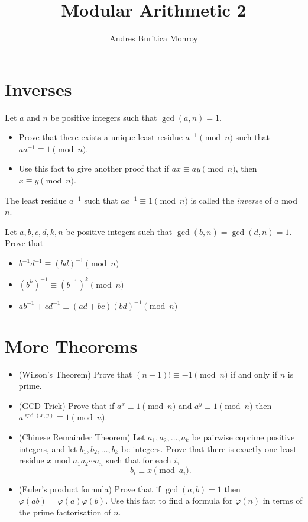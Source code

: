 \documentclass{article}
\title{Modular Arithmetic 2}
\author{Andres Buritica Monroy}
\date{}
\begin{document}
\maketitle
\section{Inverses}
Let $a$ and $n$ be positive integers such that $\gcd(a,n)=1$.
\begin{itemize}
	\item Prove that there exists a unique least residue $a^{-1}\pmod n$ such that
	      $aa^{-1}\equiv 1\pmod n$.
	\item Use this fact to give another proof that if $ax\equiv ay\pmod n$, then
	      $x\equiv y\pmod n$.
\end{itemize}
The least residue $a^{-1}$ such that $aa^{-1}\equiv 1\pmod n$ is called the \emph{inverse} of
$a$ mod $n$.

Let $a,b,c,d,k,n$ be positive integers such that
$\gcd(b,n)=\gcd(d,n)=1$. Prove that
\begin{itemize}
	\item $b^{-1}d^{-1}\equiv (bd)^{-1}\pmod n$
	\item $(b^k)^{-1}\equiv (b^{-1})^k\pmod n$
	\item $ab^{-1}+cd^{-1}\equiv (ad+bc)(bd)^{-1}\pmod n$
\end{itemize}
\section{More Theorems}
\begin{itemize}
	\item (Wilson's Theorem) Prove that $(n-1)!\equiv -1\pmod n$ if and only if $n$ is prime.
	\item (GCD Trick) Prove that if $a^x\equiv 1\pmod n$ and $a^y\equiv 1\pmod n$ then
	      $a^{\gcd(x,y)}\equiv 1\pmod n$.
	\item (Chinese Remainder Theorem) Let $a_1,a_2,\ldots,a_k$ be pairwise coprime positive integers, and let
	      $b_1,b_2,\ldots,b_k$ be integers. Prove that there is exactly one least
	      residue $x$ mod $a_1a_2\cdots a_n$ such that for each $i$,
	      \[b_i\equiv x\pmod {a_i}.\]
	\item (Euler's product formula) Prove that if $\gcd(a,b)=1$ then $\varphi(ab)=\varphi(a)\varphi(b)$. Use
	      this fact to find a formula for $\varphi(n)$ in terms of the prime
	      factorisation of $n$.
\end{itemize}
\end{document}
